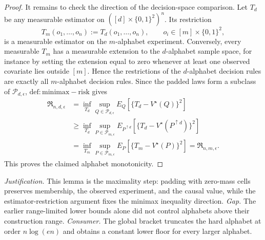 \documentclass{article}
\begin{document}
\begin{proof}
It remains to check the direction of the decision-space comparison.  Let \(T_d\) be any measurable estimator on \(([d]\times\{0,1\}^2)^n\).  Its restriction
\[
 T_m(o_1,\ldots,o_n):=T_d(o_1,\ldots,o_n),
 \qquad o_i\in[m]\times\{0,1\}^2,
\]
is a measurable estimator on the \(m\)-alphabet experiment.  Conversely, every measurable \(T_m\) has a measurable extension to the \(d\)-alphabet sample space, for instance by setting the extension equal to zero whenever at least one observed covariate lies outside \([m]\).  Hence the restrictions of the \(d\)-alphabet decision rules are exactly all \(m\)-alphabet decision rules.  Since the padded laws form a subclass of \(\mathcal P_{d,\epsilon}\), \(\mathrm{def:minimax-risk}\) gives
\[
\begin{aligned}
 \mathfrak R_{n,d,\epsilon}
 &=\inf_{T_d}\sup_{Q\in\mathcal P_{d,\epsilon}}
   E_Q\!\left[\{T_d-V^\star(Q)\}^2\right]\\
 &\geq\inf_{T_d}\sup_{P\in\mathcal P_{m,\epsilon}}
   E_{P^{\uparrow d}}\!\left[\{T_d-V^\star(P^{\uparrow d})\}^2\right]\\
 &=\inf_{T_m}\sup_{P\in\mathcal P_{m,\epsilon}}
   E_P\!\left[\{T_m-V^\star(P)\}^2\right]
 =\mathfrak R_{n,m,\epsilon}.
\end{aligned}
\]
This proves the claimed alphabet monotonicity.
\end{proof}
\par\smallskip\noindent \textit{Justification.} This lemma is the maximality step: padding with zero-mass cells preserves membership, the observed experiment, and the causal value, while the estimator-restriction argument fixes the minimax inequality direction. \textit{Gap.} The earlier range-limited lower bounds alone did not control alphabets above their construction range. \textit{Consumer.} The global bracket truncates the hard alphabet at order \(n\log(en)\) and obtains a constant lower floor for every larger alphabet.
\end{document}
